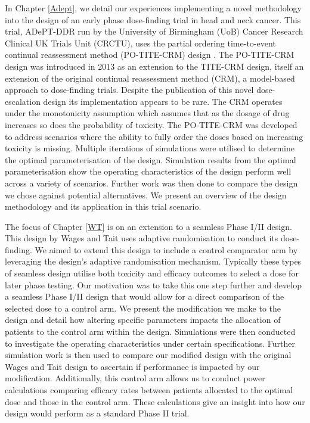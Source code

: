 In Chapter \ref{Adept}, we detail our experiences implementing a novel methodology into the design of an early phase dose-finding trial in head and neck cancer. This trial, ADePT-DDR run by the University of Birmingham (UoB) Cancer Research Clinical UK Trials Unit (CRCTU), uses the partial ordering time-to-event continual reassessment method (PO-TITE-CRM) design \cite{wagesUsingTimetoeventContinual2013}. The PO-TITE-CRM design was introduced in 2013 as an extension to the TITE-CRM design, itself an extension of the original continual reassessment method (CRM), a model-based approach to dose-finding trials. Despite the publication of this novel dose-escalation design its implementation appears to be rare. The CRM operates under the monotonicity assumption which assumes that as the dosage of drug increases so does the probability of toxicity. The PO-TITE-CRM was developed to address scenarios where the ability to fully order the doses based on increasing toxicity is missing. Multiple iterations of simulations were utilised to determine the optimal parameterisation of the design. Simulation results from the optimal parameterisation show the operating characteristics of the design perform well across a variety of scenarios. Further work was then done to compare the design we chose against potential alternatives. We present an overview of the design methodology and its application in this trial scenario.

The focus of Chapter \ref{WT} is on an extension to a seamless Phase \RN{1}/\RN{2} design. This design by Wages and Tait \cite{wagesSeamlessPhaseII2015} uses adaptive randomisation to conduct its dose-finding. We aimed to extend this design to include a control comparator arm by leveraging the design's adaptive randomisation mechanism. Typically these types of seamless design utilise both toxicity and efficacy outcomes to select a dose for later phase testing. Our motivation was to take this one step further and develop a seamless Phase \RN{1}/\RN{2} design that would allow for a direct comparison of the selected dose to a control arm. We present the modification we make to the design and detail how altering specific parameters impacts the allocation of patients to the control arm within the design. Simulations were then conducted to investigate the operating characteristics under certain specifications. Further simulation work is then used to compare our modified design with the original Wages and Tait design to ascertain if performance is impacted by our modification. Additionally, this control arm allows us to conduct power calculations comparing efficacy rates between patients allocated to the optimal dose and those in the control arm. These calculations give an insight into how our design would perform as a standard Phase \RN{2} trial. 

